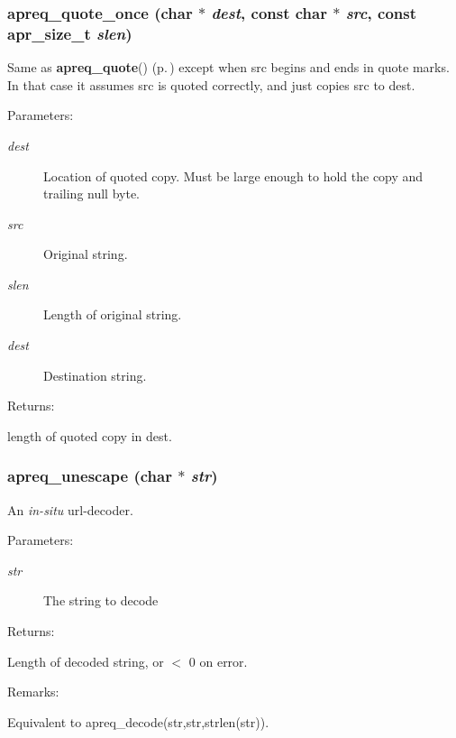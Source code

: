\subsubsection{ apreq\_\-quote\_\-once (char $\ast$ {\em dest}, const char $\ast$ {\em src}, const {\bf apr\_\-size\_\-t} {\em slen})}\label{group__Utils_a11}


Same as {\bf apreq\_\-quote}() {\rm (p.\,\pageref{group__Utils_a10})} except when src begins and ends in quote marks. In that case it assumes src is quoted correctly, and just copies src to dest. \begin{Desc}
\item[Parameters: ]\par
\begin{description}
\item[{\em 
dest}]Location of quoted copy. Must be large enough to hold the copy and trailing null byte. \item[{\em 
src}]Original string. \item[{\em 
slen}]Length of original string. \item[{\em 
dest}]Destination string. \end{description}
\end{Desc}
\begin{Desc}
\item[Returns: ]\par
length of quoted copy in dest. \end{Desc}
\subsubsection{ apreq\_\-unescape (char $\ast$ {\em str})}\label{group__Utils_a15}


An {\em in-situ} url-decoder. \begin{Desc}
\item[Parameters: ]\par
\begin{description}
\item[{\em 
str}]The string to decode \end{description}
\end{Desc}
\begin{Desc}
\item[Returns: ]\par
Length of decoded string, or $<$ 0 on error. \end{Desc}
\begin{Desc}
\item[Remarks: ]\par
Equivalent to apreq\_\-decode(str,str,strlen(str)). \end{Desc}
